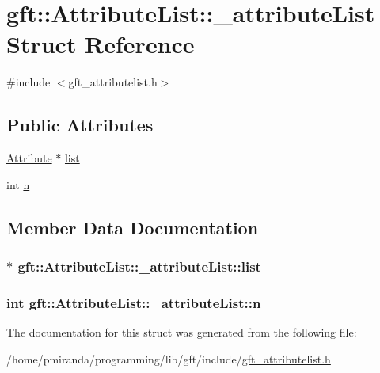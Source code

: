 \hypertarget{structgft_1_1AttributeList_1_1__attributeList}{}\section{gft\+:\+:Attribute\+List\+:\+:\+\_\+attribute\+List Struct Reference}
\label{structgft_1_1AttributeList_1_1__attributeList}


{\ttfamily \#include $<$gft\+\_\+attributelist.\+h$>$}

\subsection*{Public Attributes}
\begin{DoxyCompactItemize}
\item 
\hyperlink{namespacegft_1_1AttributeList_ab0049d5c5e2a95f984c4aa0a9c980c0e}{Attribute} $\ast$ \hyperlink{structgft_1_1AttributeList_1_1__attributeList_a6e6ea9732df0c29ddf2d7cd443dbd9e5}{list}
\item 
int \hyperlink{structgft_1_1AttributeList_1_1__attributeList_aaa391d25ac751d3a1ab61ba1b75056c2}{n}
\end{DoxyCompactItemize}


\subsection{Member Data Documentation}
\subsubsection[{\texorpdfstring{list}{list}}]{$\ast$ gft\+::\+Attribute\+List\+::\+\_\+attribute\+List\+::list}\hypertarget{structgft_1_1AttributeList_1_1__attributeList_a6e6ea9732df0c29ddf2d7cd443dbd9e5}{}\label{structgft_1_1AttributeList_1_1__attributeList_a6e6ea9732df0c29ddf2d7cd443dbd9e5}
\subsubsection[{\texorpdfstring{n}{n}}]{\setlength{\rightskip}{0pt plus 5cm}int gft\+::\+Attribute\+List\+::\+\_\+attribute\+List\+::n}\hypertarget{structgft_1_1AttributeList_1_1__attributeList_aaa391d25ac751d3a1ab61ba1b75056c2}{}\label{structgft_1_1AttributeList_1_1__attributeList_aaa391d25ac751d3a1ab61ba1b75056c2}


The documentation for this struct was generated from the following file\+:\begin{DoxyCompactItemize}
\item 
/home/pmiranda/programming/lib/gft/include/\hyperlink{gft__attributelist_8h}{gft\+\_\+attributelist.\+h}\end{DoxyCompactItemize}
